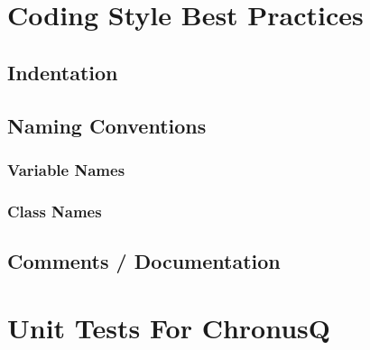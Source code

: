 \documentclass[12pt]{article}
\begin{document}
\section{Coding Style Best Practices}
\subsection{Indentation}
\subsection{Naming Conventions}
\subsubsection{Variable Names}
\subsubsection{Class Names}
\subsection{Comments / Documentation}
\section{Unit Tests For ChronusQ}
\end{document}
